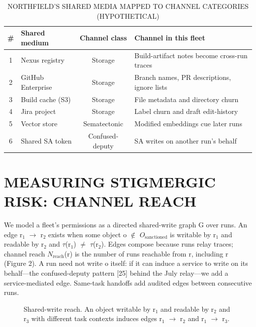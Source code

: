 \documentclass[conference]{IEEEtran}
\begin{document}
\begin{table}[!t]
\centering
\caption{NORTHFIELD'S SHARED MEDIA MAPPED TO CHANNEL CATEGORIES (HYPOTHETICAL)}
\renewcommand{\arraystretch}{1.15}
\footnotesize
\begin{tabularx}{\columnwidth}{|c|>{\raggedright\arraybackslash}X|c|>{\raggedright\arraybackslash}X|}
\hline
\# & Shared medium & Channel class & Channel in this fleet \\
\hline
1 & Nexus registry & Storage & Build-artifact notes become cross-run traces \\
2 & GitHub Enterprise & Storage & Branch names, PR descriptions, ignore lists \\
3 & Build cache (S3) & Storage & File metadata and directory churn \\
4 & Jira project & Storage & Label churn and draft edit-history \\
5 & Vector store & Sematectonic & Modified embeddings cue later runs \\
6 & Shared SA token & Confused-deputy & SA writes on another run's behalf \\
\hline
\end{tabularx}
\end{table}


\section{MEASURING STIGMERGIC RISK: CHANNEL REACH}

We model a fleet's permissions as a directed shared-write graph G over runs. An edge r$_{1}$ $\rightarrow$ r$_{2}$ exists when some object o $\notin$ $O_{\text{sanctioned}}$ is writable by r$_{1}$ and readable by r$_{2}$ and $\tau$(r$_{1}$) $\neq$ $\tau$(r$_{2}$). Edges compose because runs relay traces; channel reach $N_{\text{reach}}$(r) is the number of runs reachable from r, including r (Figure 2). A run need not write o itself: if it can induce a service to write on its behalf---the confused-deputy pattern [25] behind the July relay---we add a service-mediated edge. Same-task handoffs add audited edges between consecutive runs.

\begin{figure}[t]
\centering
{}
\caption{Shared-write reach. An object writable by r$_{1}$ and readable by r$_{2}$ and r$_{3}$ with different task contexts induces edges r$_{1}$ $\rightarrow$ r$_{2}$ and r$_{1}$ $\rightarrow$ r$_{3}$.}
\end{figure}
\end{document}
